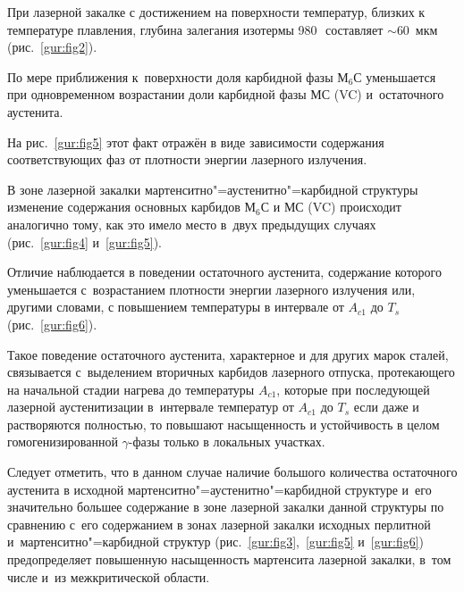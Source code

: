 При лазерной закалке с достижением на поверхности температур, близких к температуре плавления, глубина залегания изотермы 980\,\textcelsius\ составляет $\sim 60$~мкм (рис.~\ref{gur:fig2}). 

По мере приближения к~поверхности доля карбидной фазы М$_6$С уменьшается при одновременном возрастании доли карбидной фазы МС (VC) и~остаточного аустенита. 

На рис.~\ref{gur:fig5} этот факт отражён в виде зависимости содержания соответствующих фаз от плотности энергии лазерного излучения.







В зоне лазерной закалки мартенситно"=аустенитно"=карбидной структуры изменение содержания основных карбидов М$_6$С и МС (VC) происходит аналогично тому, как это имело место в~двух предыдущих случаях (рис.~\ref{gur:fig4} и~\ref{gur:fig5}). 

Отличие наблюдается в поведении остаточного аустенита, содержание которого уменьшается с~возрастанием плотности энергии лазерного излучения или, другими словами, с повышением температуры в интервале от $A_{c1}$ до $T_{s}$ (рис.~\ref{gur:fig6}).

Такое поведение остаточного аустенита, характерное и для других марок сталей, связывается с~выделением вторичных карбидов лазерного отпуска, протекающего на начальной стадии нагрева до температуры $A_{c1}$, которые при последующей лазерной аустенитизации в~интервале температур от $A_{c1}$ до $T_{s}$ если даже и растворяются полностью, то повышают насыщенность и устойчивость в целом гомогенизированной $\gamma $-фазы только в локальных участках.





Следует отметить, что в данном случае наличие большого количества остаточного аустенита в исходной мартенситно"=аустенитно"=карбидной структуре и~его значительно большее содержание в зоне лазерной закалки данной структуры по сравнению с~его содержанием в зонах лазерной закалки исходных перлитной и~мартенситно"=карбидной структур (рис.~\ref{gur:fig3},~\ref{gur:fig5} и~\ref{gur:fig6}) предопределяет повышенную насыщенность мартенсита лазерной закалки, в~том числе и~из межкритической области.





